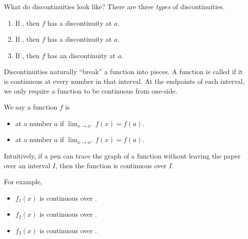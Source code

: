 \documentclass[../main.tex]{subfiles}
\begin{document}
What do discontinuities look like? There are three \emph{types} of discontinuities.

\begin{figure}[h]  %
  \centering
  
  \label{fig:discontinuities}
\end{figure}

\begin{enumerate}[itemsep={3ex}]
  \item If \underline{\hspace{3in}}, then \(f\) has a  discontinuity at \(a\).
  \item If \underline{\hspace{3in}}, then \(f\) has a  discontinuity at \(a\).
  \item If \underline{\hspace{3in}}, then \(f\) has an  discontinuity at \(a\).
\end{enumerate}

Discontinuities naturally ``break'' a function into pieces.
A function is called  if it is continuous at every number in that interval. At the endpoints of each interval, we only require a function to be continuous from one-side.

We say a function \(f\) is 
\begin{itemize}
  \item {} at a number \(a\) if \(\lim_{{x \to a^{-}}} f(x) = f(a)\).
  \item {} at a number \(a\) if \(\lim_{{x \to a^{+}}} f(x) = f(a)\).
\end{itemize}

Intuitively, if a pen can trace the graph of a function without leaving the paper over an interval \(I\), then the function is continuous over \(I\).

For example, 
\begin{itemize}[itemsep={3ex}]
  \item \(f_{1}(x)\) is continuous over \underline{\hspace{2in}}.
  \item \(f_{2}(x)\) is continuous over \underline{\hspace{2in}}.
  \item \(f_{3}(x)\) is continuous over \underline{\hspace{2in}}.
\end{itemize}
\vfill{}
\clearpage
\end{document}
